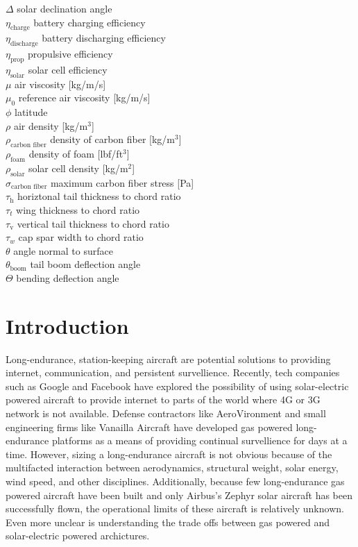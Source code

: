 \documentclass[]{aiaa-tc}%
\begin{document}
\begin{multicols}{2}
\begin{tabbing}
$\Delta$ \> solar declination angle \\
$\eta_{\text{charge}}$ \> battery charging efficiency \\
$\eta_{\text{discharge}}$ \> battery discharging efficiency \\
$\eta_{\text{prop}}$ \> propulsive efficiency \\
$\eta_{\text{solar}}$ \> solar cell efficiency \\
$\mu$ \> air viscosity [kg/m/s] \\
$\mu_0$ \> reference air viscosity [kg/m/s] \\
$\phi$ \> latitude \\
$\rho$ \> air density [kg/m$^3$] \\
$\rho_{\text{carbon fiber}}$ \> density of carbon fiber [kg/m$^3$] \\
$\rho_{\text{foam}}$ \> density of foam [lbf/ft$^3$] \\
$\rho_{\text{solar}}$ \> solar cell density [kg/m$^2$] \\
$\sigma_{\text{carbon fiber}}$ \> maximum carbon fiber stress [Pa] \\
$\tau_{\text{h}}$ \> horiztonal tail thickness to chord ratio \\
$\tau_t$ \> wing thickness to chord ratio \\
$\tau_{\text{v}}$ \> vertical tail thickness to chord ratio \\
$\tau_w$ \> cap spar width to chord ratio \\
$\theta$ \> angle normal to surface \\
$\theta_{\text{boom}}$ \> tail boom deflection angle \\
$\Theta$ \> bending deflection angle 
 \end{tabbing}

\end{multicols}

\section{Introduction}

Long-endurance, station-keeping aircraft are potential solutions to providing internet, communication, and persistent survellience. 
Recently, tech companies such as Google and Facebook have explored the possibility of using solar-electric powered aircraft to provide internet to parts of the world where 4G or 3G network is not available. 
Defense contractors like AeroVironment and small engineering firms like Vanailla Aircraft have developed gas powered long-endurance platforms as a means of providing continual survellience for days at a time.  
However, sizing a long-endurance aircraft is not obvious because of the multifacted interaction between aerodynamics, structural weight, solar energy, wind speed, and other disciplines.
Additionally, because few long-endurance gas powered aircraft have been built and only Airbus's Zephyr solar aircraft has been successfully flown, the operational limits of these aircraft is relatively unknown. 
Even more unclear is understanding the trade offs between gas powered and solar-electric powered archictures. 
\end{document}
